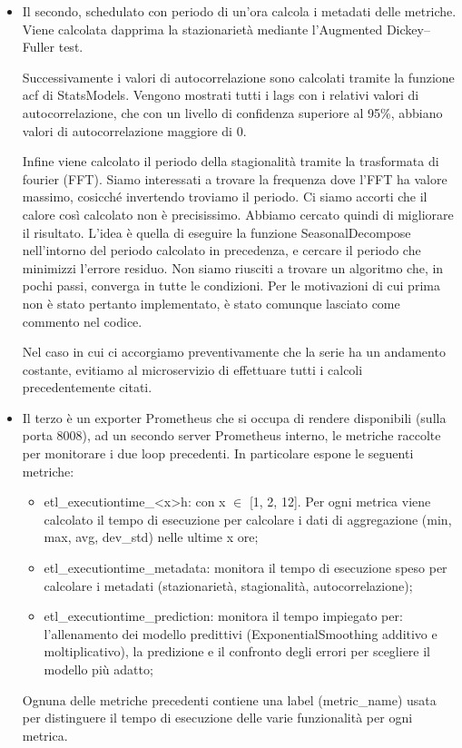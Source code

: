 \documentclass{article}
\begin{document}
\begin{itemize}
            \item Il secondo, schedulato con periodo di un'ora calcola i metadati delle metriche. Viene calcolata dapprima la stazionarietà mediante l'Augmented Dickey–Fuller test.
            
            Successivamente i valori di autocorrelazione sono calcolati tramite la funzione acf di StatsModels. Vengono mostrati tutti i lags con i relativi valori di autocorrelazione, che con un livello di confidenza superiore al 95\%, abbiano valori di autocorrelazione maggiore di 0. 

            Infine viene calcolato il periodo della stagionalità tramite la trasformata di fourier (FFT). Siamo interessati a trovare la frequenza dove l'FFT ha valore massimo, cosicché invertendo troviamo il periodo.
            Ci siamo accorti che il calore così calcolato non è precisissimo. Abbiamo cercato quindi di migliorare il risultato. L'idea è quella di eseguire la funzione SeasonalDecompose nell'intorno del periodo calcolato in precedenza, e cercare il periodo che minimizzi l'errore residuo. Non siamo riusciti a trovare un algoritmo che, in pochi passi, converga in tutte le condizioni. Per le motivazioni di cui prima non è stato pertanto implementato, è stato comunque lasciato come commento nel codice.
            
            Nel caso in cui ci accorgiamo preventivamente che la serie ha un andamento costante, evitiamo al microservizio di effettuare tutti i calcoli precedentemente citati.
            \item Il terzo è un exporter Prometheus che si occupa di rendere disponibili (sulla porta 8008), ad un secondo server Prometheus interno, le metriche raccolte per monitorare i due loop precedenti. In particolare espone le seguenti metriche:
                \begin{itemize}
                    \item etl\_executiontime\_<x>h: con x $\in$ [1, 2, 12]. Per ogni metrica viene calcolato il tempo di esecuzione per calcolare i dati di aggregazione (min, max, avg, dev\_std) nelle ultime x ore;
                    \item etl\_executiontime\_metadata: monitora il tempo di esecuzione speso per calcolare i metadati (stazionarietà, stagionalità, autocorrelazione);
                    \item etl\_executiontime\_prediction: monitora il tempo impiegato per: l'allenamento dei modello predittivi (ExponentialSmoothing additivo e moltiplicativo), la predizione e il confronto degli errori per scegliere il modello più adatto;
                \end{itemize}
            Ognuna delle metriche precedenti contiene una label (metric\_name) usata per distinguere il tempo di esecuzione delle varie funzionalità per ogni metrica.
        \end{itemize}    
\end{document}
